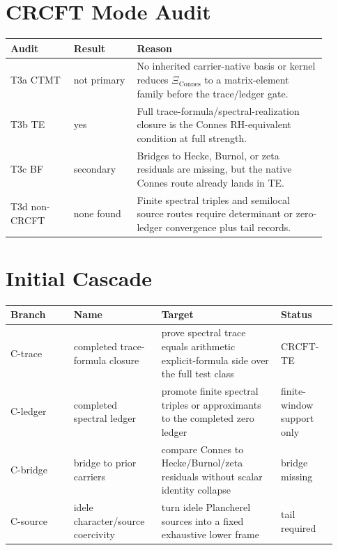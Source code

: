 \documentclass[11pt]{article}
\newcommand{\XiConnes}{\Xi_{\mathrm{Connes}}}
\newcommand{\CRCFT}{\mathrm{CRCFT}}
\begin{document}
\section*{CRCFT Mode Audit}

\begin{center}
\begin{tabular}{p{0.18\linewidth}p{0.18\linewidth}p{0.54\linewidth}}
\toprule
Audit & Result & Reason\\
\midrule
T3a CTMT & not primary
& No inherited carrier-native basis or kernel reduces \(\XiConnes\) to a
matrix-element family before the trace/ledger gate.\\
T3b TE & yes
& Full trace-formula/spectral-realization closure is the Connes RH-equivalent
condition at full strength.\\
T3c BF & secondary
& Bridges to Hecke, Burnol, or zeta residuals are missing, but the native
Connes route already lands in TE.\\
T3d non-CRCFT & none found
& Finite spectral triples and semilocal source routes require determinant or
zero-ledger convergence plus tail records.\\
\bottomrule
\end{tabular}
\end{center}

\section*{Initial Cascade}

\begin{center}
\begin{tabular}{p{0.18\linewidth}p{0.25\linewidth}p{0.34\linewidth}p{0.16\linewidth}}
\toprule
Branch & Name & Target & Status\\
\midrule
C-trace & completed trace-formula closure
& prove spectral trace equals arithmetic explicit-formula side over the full test class
& \(\CRCFT\)-TE\\
C-ledger & completed spectral ledger
& promote finite spectral triples or approximants to the completed zero ledger
& finite-window support only\\
C-bridge & bridge to prior carriers
& compare Connes to Hecke/Burnol/zeta residuals without scalar identity collapse
& bridge missing\\
C-source & idele character/source coercivity
& turn idele Plancherel sources into a fixed exhaustive lower frame
& tail required\\
\bottomrule
\end{tabular}
\end{center}
\end{document}

